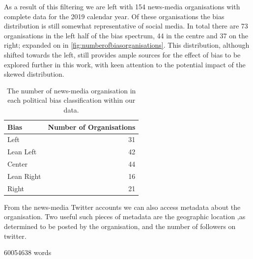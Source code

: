 


As a result of this filtering we are left with 154 news-media organisations with complete data for the 2019 calendar year. Of these organisations the bias distribution is still somewhat representative of social media.  In total there are 73 organisations in the left half of the bias spectrum, 44 in the centre and 37 on the right; expanded on in \autoref{fig:numberofbiasorganisations}. This distribution, although shifted towards the left, still provides ample sources for the effect of bias to be explored further in this work, with keen attention to the potential impact of the skewed distribution. 

\begin{table}[h]
	\begin{tabular}{lr}
		\toprule
		Bias &   Number of Organisations \\
		\midrule
		{\color{Left} Left }&  31 \\
		{\color{LeanLeft} Lean Left }&  42 \\
		{\color{Center} Center }&  44 \\
		{\color{LeanRight} Lean Right }&  16 \\
		{\color{Right} Right }&  21 \\
		\bottomrule
	\end{tabular}
	\caption{The number of news-media organisation in each political bias classification within our data.}
	\label{fig:numberofbiasorganisations}
\end{table}


From the news-media Twitter accounts we can also access metadata about the organisation. Two useful such pieces of metadata are the geographic location ,as determined to be posted by the organisation, and the number of followers on twitter.




60054638 words
